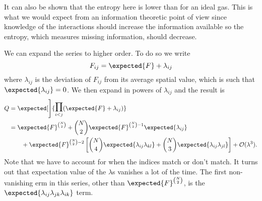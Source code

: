 \documentclass[fleqn]{NotesClass}
\newcommand*{\order}{\mathcal{O}}
\begin{document}
    It can also be shown that the entropy here is lower than for an ideal gas.
    This is what we would expect from an information theoretic point of view since knowledge of the interactions should increase the information available so the entropy, which measures missing information, should decrease.
    
    We can expand the series to higher order.
    To do so we write
    \begin{equation}
        F_{ij} = \expected{F} + \lambda_{ij}
    \end{equation}
    where \(\lambda_{ij}\) is the deviation of \(F_{ij}\) from its average spatial value, which is such that \(\expected{\lambda_{ij}} = 0\).
    We then expand in powers of \(\lambda_{ij}\) and the result is
    \begin{align}
        Q &= \expected[\Bigg]{\raisebox{0.6ex}{\(\displaystyle\prod_{i<j}\)} (\expected{F} + \lambda_{ij})}\\
        &= \expected{F}^{\binom{N}{2}} + \binom{N}{2}\expected{F}^{\binom{N}{2} - 1} \expected{\lambda_{ij}}\\
        &\qquad+ \expected{F}^{\binom{N}{2} - 2} \left[ \binom{N}{4} \expected{\lambda_{ij}\lambda_{kl}} + \binom{N}{3}\expected{\lambda_{ij}\lambda_{jl}} \right] + \order(\lambda^3).
    \end{align}
    Note that we have to account for when the indices match or don't match.
    It turns out that expectation value of the \(\lambda\)s vanishes a lot of the time.
    The first non-vanishing erm in this series, other than \(\expected{F}^{\binom{N}{2}}\), is the \(\expected{\lambda_{ij}\lambda_{jk}\lambda_{ik}}\) term.
    
\end{document}
